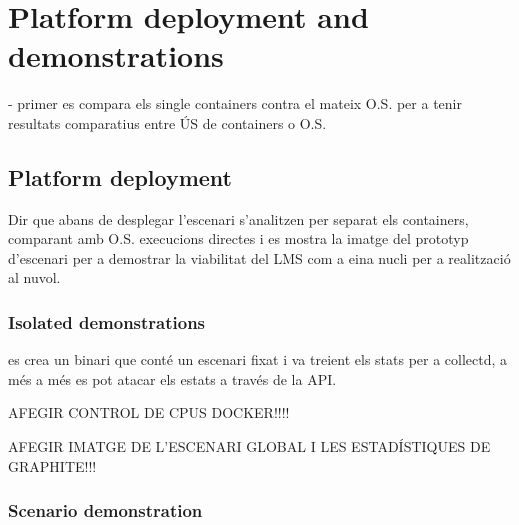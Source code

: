 \chapter{Platform deployment and demonstrations}\label{H:platformDeploymentAndDemonstrations}

- primer es compara els single containers contra el mateix O.S. per a tenir resultats comparatius entre ÚS de containers o O.S.

\section{Platform deployment}

Dir que abans de desplegar l'escenari s'analitzen per separat els containers, comparant amb O.S. execucions directes i es mostra la imatge del prototyp d'escenari per a demostrar la viabilitat del LMS com a eina nucli per a realització al nuvol.

\subsection{Isolated demonstrations}

es crea un binari que conté un escenari fixat i va treient els stats per a collectd, a  més a més es pot atacar els estats a través de la API.

AFEGIR CONTROL DE CPUS DOCKER!!!!

AFEGIR IMATGE DE L'ESCENARI GLOBAL I LES ESTADÍSTIQUES DE GRAPHITE!!!

\subsection{Scenario demonstration}
